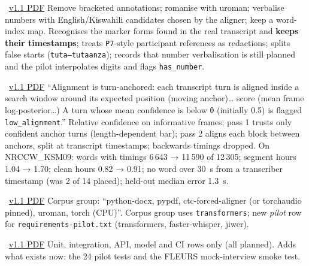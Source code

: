 \documentclass[11pt]{article}
\begin{document}
 { \textperiodcentered\ \href{archive/v1.1/02_TRD.pdf}{v1.1 PDF}}
 {Remove bracketed annotations; romanise with uroman; verbalise numbers with English/Kiswahili candidates chosen by the aligner; keep a word-index map.}
 {Recognises the marker forms found in the real transcript and \textbf{keeps their timestamps}; treats \texttt{P7}-style participant references as redactions; splits false starts (\texttt{tuta--tutaanza}); records that number verbalisation is still planned and the pilot interpolates digits and flags \texttt{has\_number}.}

 { \textperiodcentered\ \href{archive/v1.1/02_TRD.pdf}{v1.1 PDF}}
 {``Alignment is turn-anchored: each transcript turn is aligned inside a search window around its expected position (moving anchor)\ldots{} score (mean frame log-posterior\ldots) A turn whose mean confidence is below θ (initially 0.5) is flagged \texttt{low\_alignment}.''}
 {Relative confidence on informative frames; pass 1 trusts only confident anchor turns (length-dependent bar); pass 2 aligns each block between anchors, split at transcript timestamps; backwards timings dropped. On NRCCW\_KSM09: words with timings 6\,643 → 11\,590 of 12\,305; segment hours 1.04 → 1.70; clean hours 0.82 → 0.91; no word over 30~s from a transcriber timestamp (was 2 of 14 placed); held-out median error 1.3~s.}

 { \textperiodcentered\ \href{archive/v1.1/02_TRD.pdf}{v1.1 PDF}}
 {Corpus group: ``python-docx, pypdf, ctc-forced-aligner (or torchaudio pinned), uroman, torch (CPU)''.}
 {Corpus group uses \texttt{transformers}; new \emph{pilot} row for \texttt{requirements-pilot.txt} (transformers, faster-whisper, jiwer).}

 { \textperiodcentered\ \href{archive/v1.1/02_TRD.pdf}{v1.1 PDF}}
 {Unit, integration, API, model and CI rows only (all planned).}
 {Adds what exists now: the 24 pilot tests and the FLEURS mock-interview smoke test.}
\end{document}
